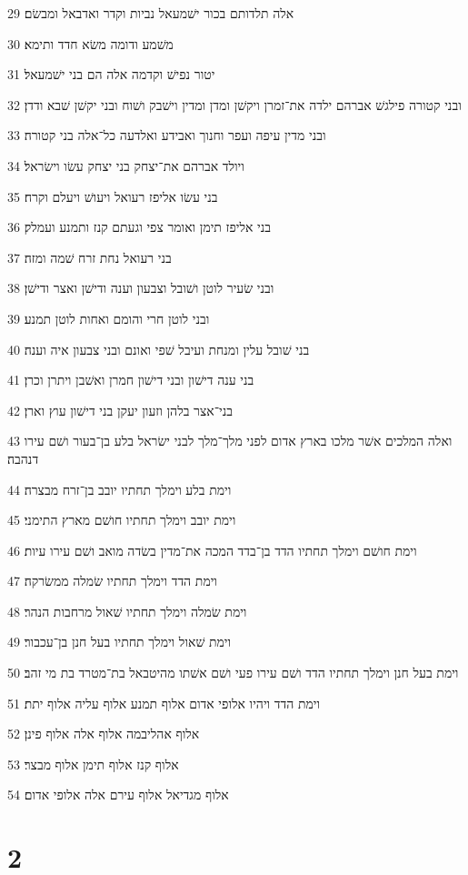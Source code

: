 \par 29 אלה תלדותם בכור ישׁמעאל נביות וקדר ואדבאל ומבשׂם׃
\par 30 משׁמע ודומה משׂא חדד ותימא׃
\par 31 יטור נפישׁ וקדמה אלה הם בני ישׁמעאל׃
\par 32 ובני קטורה פילגשׁ אברהם ילדה את־זמרן ויקשׁן ומדן ומדין וישׁבק ושׁוח ובני יקשׁן שׁבא ודדן׃
\par 33 ובני מדין עיפה ועפר וחנוך ואבידע ואלדעה כל־אלה בני קטורה׃
\par 34 ויולד אברהם את־יצחק בני יצחק עשׂו וישׂראל׃
\par 35 בני עשׂו אליפז רעואל ויעושׁ ויעלם וקרח׃
\par 36 בני אליפז תימן ואומר צפי וגעתם קנז ותמנע ועמלק׃
\par 37 בני רעואל נחת זרח שׁמה ומזה׃
\par 38 ובני שׂעיר לוטן ושׁובל וצבעון וענה ודישׁן ואצר ודישׁן׃
\par 39 ובני לוטן חרי והומם ואחות לוטן תמנע׃
\par 40 בני שׁובל עלין ומנחת ועיבל שׁפי ואונם ובני צבעון איה וענה׃
\par 41 בני ענה דישׁון ובני דישׁון חמרן ואשׁבן ויתרן וכרן׃
\par 42 בני־אצר בלהן וזעון יעקן בני דישׁון עוץ וארן׃
\par 43 ואלה המלכים אשׁר מלכו בארץ אדום לפני מלך־מלך לבני ישׂראל בלע בן־בעור ושׁם עירו דנהבה׃
\par 44 וימת בלע וימלך תחתיו יובב בן־זרח מבצרה׃
\par 45 וימת יובב וימלך תחתיו חושׁם מארץ התימני׃
\par 46 וימת חושׁם וימלך תחתיו הדד בן־בדד המכה את־מדין בשׂדה מואב ושׁם עירו עיות׃
\par 47 וימת הדד וימלך תחתיו שׂמלה ממשׂרקה׃
\par 48 וימת שׂמלה וימלך תחתיו שׁאול מרחבות הנהר׃
\par 49 וימת שׁאול וימלך תחתיו בעל חנן בן־עכבור׃
\par 50 וימת בעל חנן וימלך תחתיו הדד ושׁם עירו פעי ושׁם אשׁתו מהיטבאל בת־מטרד בת מי זהב׃
\par 51 וימת הדד ויהיו אלופי אדום אלוף תמנע אלוף עליה אלוף יתת׃
\par 52 אלוף אהליבמה אלוף אלה אלוף פינן׃
\par 53 אלוף קנז אלוף תימן אלוף מבצר׃
\par 54 אלוף מגדיאל אלוף עירם אלה אלופי אדום׃

\chapter{2}

